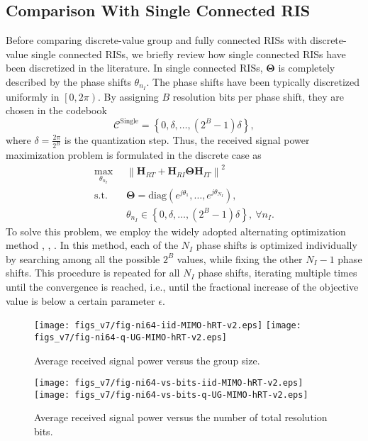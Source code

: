 \documentclass[twocolumn,10pt]{IEEEtran}
\begin{document}
\subsection{Comparison With Single Connected RIS}

Before comparing discrete-value group and fully connected RISs with discrete-value single connected RISs, we briefly review how single connected RISs have been discretized in the literature.
In single connected RISs, $\boldsymbol{\Theta}$ is completely described by the phase shifts $\theta_{n_{I}}$.
The phase shifts have been typically discretized uniformly in $\left[0,2\pi\right)$.
By assigning $B$ resolution bits per phase shift, they are chosen in the codebook
\begin{equation}
\mathcal{C}^{\text{Single}} = \left\{ 0,\delta,\ldots,\left( 2^{B} - 1 \right) \delta \right\},
\end{equation}
where $\delta = \frac{2\pi}{2^{B}}$ is the quantization step.
Thus, the received signal power maximization problem is formulated in the discrete case as
\begin{align}
\underset{\theta_{n_{I}}}{\mathsf{\mathrm{max}}}\;\;
& \left\|\mathbf{H}_{RT}+\mathbf{H}_{RI}\boldsymbol{\Theta}\mathbf{H}_{IT}\right\|^{2}\label{eq:P-SC-D-obj}\\
\mathsf{\mathrm{s.t.}}\;\;\;
& \boldsymbol{\Theta}=\mathrm{diag}\left(e^{j\theta_{1}},\ldots,e^{j\theta_{N_{I}}}\right),\label{eq:P-SC-D-con1}\\
& \theta_{n_{I}}\in \left\{ 0,\delta,\ldots,\left( 2^{B} - 1 \right) \delta \right\},\:\forall n_{I}.\label{eq:P-SC-D-con2}
\end{align}
To solve this problem, we employ the widely adopted alternating optimization method \cite{you20}, \cite{abe20}, \cite{wu19b}.
In this method, each of the $N_I$ phase shifts is optimized individually by searching among all the possible $2^B$ values, while fixing the other $N_I-1$ phase shifts.
This procedure is repeated for all $N_I$ phase shifts, iterating multiple times until the convergence is reached, i.e., until the fractional increase of the objective value is below a certain parameter $\epsilon$.

\begin{figure*}[t]
    \centering
    \texttt{[image: figs\_v7/fig-ni64-iid-MIMO-hRT-v2.eps]}
    \texttt{[image: figs\_v7/fig-ni64-q-UG-MIMO-hRT-v2.eps]}
    \caption{Average received signal power versus the group size.}
    \label{fig:ni64}
\end{figure*}
\begin{figure*}[t]
    \centering
    \texttt{[image: figs\_v7/fig-ni64-vs-bits-iid-MIMO-hRT-v2.eps]}
    \texttt{[image: figs\_v7/fig-ni64-vs-bits-q-UG-MIMO-hRT-v2.eps]}
    \caption{Average received signal power versus the number of total resolution bits.}
    \label{fig:ni64-vs-bits}
\end{figure*}
\end{document}
